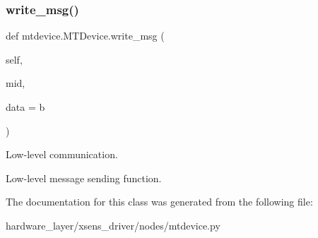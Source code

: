 \subsubsection{\texorpdfstring{write\+\_\+msg()}{write\_msg()}}
{\footnotesize\ttfamily def mtdevice.\+M\+T\+Device.\+write\+\_\+msg (\begin{DoxyParamCaption}\item[{}]{self,  }\item[{}]{mid,  }\item[{}]{data = {\ttfamily b\textquotesingle{}\textquotesingle{}} }\end{DoxyParamCaption})}



Low-\/level communication. 

\begin{DoxyVerb}Low-level message sending function.\end{DoxyVerb}
 

The documentation for this class was generated from the following file\+:\begin{DoxyCompactItemize}
\item 
hardware\+\_\+layer/xsens\+\_\+driver/nodes/mtdevice.\+py\end{DoxyCompactItemize}
